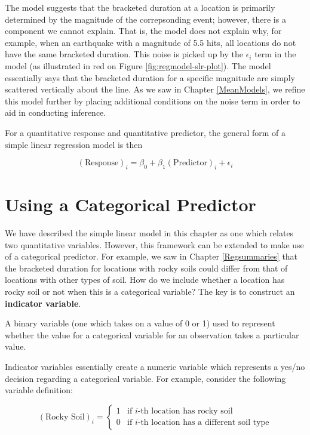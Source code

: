 \documentclass[]{book}
\theoremstyle{plain}
\theoremstyle{mydefn}
\theoremstyle{myexmpl}
\theoremstyle{remark}
\let\BeginKnitrBlock\begin \let\EndKnitrBlock\end
\let\BeginKnitrBlock\begin \let\EndKnitrBlock\end
\begin{document}
The model suggests that the bracketed duration at a location is
primarily determined by the magnitude of the correpsonding event;
however, there is a component we cannot explain. That is, the model does
not explain why, for example, when an earthquake with a magnitude of 5.5
hits, all locations do not have the same bracketed duration. This noise
is picked up by the \(\epsilon_i\) term in the model (as illustrated in
red on Figure \ref{fig:regmodel-slr-plot}). The model essentially says
that the bracketed duration for a specific magnitude are simply
scattered vertically about the line. As we saw in Chapter
\ref{MeanModels}, we refine this model further by placing additional
conditions on the noise term in order to aid in conducting inference.

\BeginKnitrBlock{rmdtip}
For a quantitative response and quantitative predictor, the general form
of a simple linear regression model is then

\[(\text{Response})_i = \beta_0 + \beta_1(\text{Predictor})_i + \epsilon_i\]
\EndKnitrBlock{rmdtip}

\section{Using a Categorical
Predictor}\label{using-a-categorical-predictor}

We have described the simple linear model in this chapter as one which
relates two quantitative variables. However, this framework can be
extended to make use of a categorical predictor. For example, we saw in
Chapter \ref{Regsummaries} that the bracketed duration for locations
with rocky soils could differ from that of locations with other types of
soil. How do we include whether a location has rocky soil or not when
this is a categorical variable? The key is to construct an
\textbf{indicator variable}.

\BeginKnitrBlock{definition}[Indicator Variable]
\protect\hypertarget{def:defn-indicator-variable}{}{\label{def:defn-indicator-variable}
{} }A binary variable (one which takes
on a value of 0 or 1) used to represent whether the value for a
categorical variable for an observation takes a particular value.
\EndKnitrBlock{definition}

Indicator variables essentially create a numeric variable which
represents a yes/no decision regarding a categorical variable. For
example, consider the following variable definition:

\[
(\text{Rocky Soil})_i = \begin{cases} 1 & \text{if } i\text{-th location has rocky soil} \\
0 & \text{if } i\text{-th location has a different soil type} \end{cases}
\]
\end{document}
